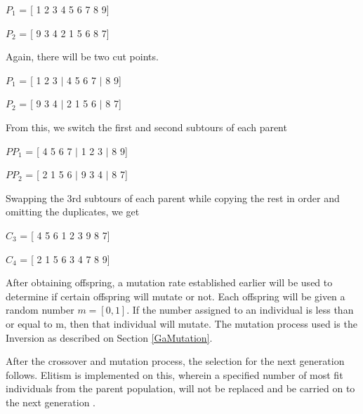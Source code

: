 \hfill \par 

$P_{1}$ = [ 1 2 3 4 5 6 7 8 9] \par 
$P_{2}$ = [ 9 3 4 2 1 5 6 8 7] \par

\hfill \par 
Again, there will be two cut points. \par
\hfill \par 

$P_{1}$ = [ 1 2 3 $|$ 4 5 6 7 $|$ 8 9] \par 
$P_{2}$ = [ 9 3 4 $|$ 2 1 5 6 $|$ 8 7] \par

\hfill \par 

From this, we switch the first and second subtours of each parent \par 

\hfill \par 

$PP_{1}$ = [ 4 5 6 7 $|$ 1 2 3 $|$ 8 9] \par 
$PP_{2}$ = [ 2 1 5 6 $|$ 9 3 4 $|$ 8 7] \par

\hfill \par 

Swapping the 3rd subtours of each parent while copying the rest in order and omitting the duplicates, we get 
\par 
\hfill \par
$C_{3}$ = [ 4 5 6 1 2 3 9 8 7] \par 
$C_{4}$ = [ 2 1 5 6 3 4 7 8 9] \par

\hfill \par 

After obtaining offspring, a mutation rate established earlier will be used to determine if certain offspring will mutate or not. Each offspring will be given a random number $m=[0,1]$. If the number assigned to an individual is less than or equal to m, then that individual will mutate. The mutation process used is the Inversion as described on Section \ref{GaMutation}.  \par 

After the crossover and mutation process, the selection for the next generation follows. Elitism is implemented on this, wherein a specified number of most fit individuals from the parent population, will not be replaced and be carried on to the next generation \cite{yang2007genetic}. \par 

